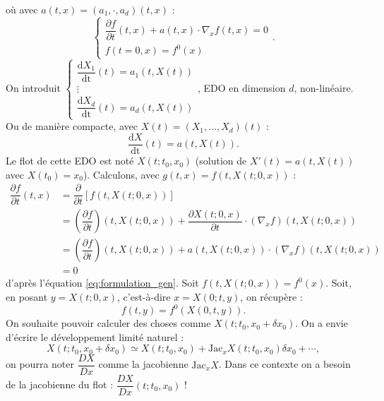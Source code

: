 \documentclass[12pt,a4paper]{article}
\newcommand\diff[2]{\dfrac{\partial #1}{\partial #2}}
\newcommand\deriv[2]{\dfrac{\mathrm{d}#1}{\mathrm{d#2}}}
\begin{document}
	où avec $a(t,x) = (a_1,\cdot,a_d)(t,x)$ :
	\begin{equation}\label{eq:formulation_gen}
		\begin{cases}
			\diff ft(t,x) + a(t,x) \cdot \nabla_x f(t,x) = 0\\
			f(t=0,x) = f^0(x)
		\end{cases}.
	\end{equation}
	On introduit $\begin{cases}
		\deriv{X_1}t(t) = a_1(t,X(t))\\
		\vdots\\
		\deriv{X_d}t(t) = a_d(t,X(t))
	\end{cases}$, EDO en dimension $d$, non-linéaire. Ou de manière compacte, avec $X(t) = (X_1,\ldots,X_d)(t)$ :
	\begin{equation}
		\deriv Xt(t) = a(t,X(t)).
	\end{equation}
	Le flot de cette EDO est noté $X(t;t_0,x_0)$ (solution de $X'(t) = a(t,X(t))$ avec $X(t_0) = x_0$). Calculons, avec $g(t,x) = f(t,X(t;0,x))$ :
	\[
	\begin{aligned}
		\diff ft(t,x) &= \diff{}t\left[f(t,X(t;0,x))\right]\\
		&= \left(\diff ft\right)(t,X(t;0,x)) + \diff {X(t;0,x)}t \cdot \left(\nabla_x f\right)(t,X(t;0,x))\\
		&= \left(\diff ft\right)(t,X(t;0,x)) + a(t,X(t;0,x)) \cdot  \left(\nabla_x f\right)(t,X(t;0,x))\\
		&= 0
	\end{aligned}
	\]
	d'après l'équation \eqref{eq:formulation_gen}. Soit $f(t,X(t;0,x)) = f^0(x)$. Soit, en posant $y=X(t;0,x)$, c'est-à-dire $x=X(0;t,y)$, on récupère :
	\begin{equation}
		f(t,y) = f^0(X(0,t,y)).
	\end{equation}
	On souhaite pouvoir calculer des choses comme $X(t;t_0,x_0+\delta x_0)$. On a envie d'écrire le développement limité naturel :
	\begin{equation}
		X(t;t_0,x_0+\delta x_0) \simeq X(t;t_0,x_0) + \mathrm{Jac}_xX(t;t_0,x_0) \delta x_0 + \cdots,
	\end{equation}
	on pourra noter $\dfrac{DX}{Dx}$ comme la jacobienne $\mathrm{Jac}_xX$. Dans ce contexte on a besoin de la jacobienne du flot : $\dfrac{DX}{Dx}(t;t_0,x_0)$ !
	
\end{document}
